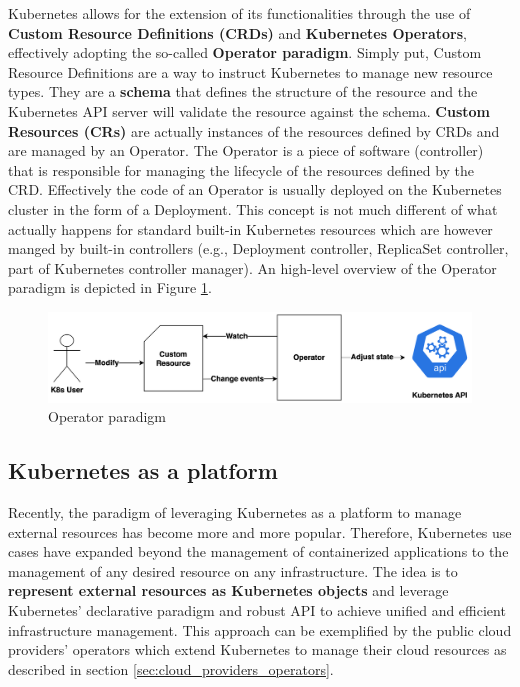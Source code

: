 Kubernetes allows for the extension of its functionalities through the use of \textbf{Custom Resource Definitions (CRDs)} and \textbf{Kubernetes Operators}, effectively adopting the so-called \textbf{Operator paradigm}.
Simply put, Custom Resource Definitions are a way to instruct Kubernetes to manage new resource types. 
They are a \textbf{schema} that defines the structure of the resource and the Kubernetes API server will validate the resource against the schema.
\textbf{Custom Resources (CRs)} are actually instances of the resources defined by CRDs and are managed by an Operator.
The Operator is a piece of software (controller) that is responsible for managing the lifecycle of the resources defined by the CRD.
Effectively the code of an Operator is usually deployed on the Kubernetes cluster in the form of a Deployment.
This concept is not much different of what actually happens for standard built-in Kubernetes resources which are however manged by built-in controllers (e.g., Deployment controller, ReplicaSet controller, part of Kubernetes controller manager).
An high-level overview of the Operator paradigm is depicted in Figure \ref{fig:operator_paradigm}.

\begin{figure}[H]
    \centering
    \includegraphics[width=1\linewidth]{images/opeartor_paradigm.png}
    \caption{Operator paradigm}
    \label{fig:operator_paradigm}
\end{figure}

\subsection{Kubernetes as a platform}

Recently, the paradigm of leveraging Kubernetes as a platform to manage external resources has become more and more popular.
Therefore, Kubernetes use cases have expanded beyond the management of containerized applications to the management of any desired resource on any infrastructure.
The idea is to \textbf{represent external resources as Kubernetes objects} and leverage Kubernetes' declarative paradigm and robust API to achieve unified and efficient infrastructure management.
This approach can be exemplified by the public cloud providers' operators which extend Kubernetes to manage their cloud resources as described in section \ref{sec:cloud_providers_operators}.


